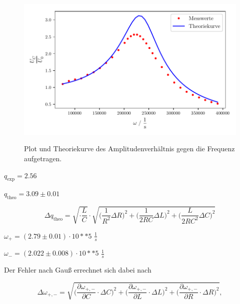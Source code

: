 \begin{figure}
    \centering
    \includegraphics{build/plot-guete.pdf}
    \label{fig:guete}
    \caption{Plot und Theoriekurve des Amplitudenverhältnis gegen die Frequenz aufgetragen.}
\end{figure}

\begin{center}
    $q_\text{exp} = 2.56$
\end{center}

\begin{center}
    $q_\text{theo} = 3.09 \pm 0.01$
\end{center}

\begin{equation}
    \Delta q_\text{theo} = \sqrt{\cdot \frac{L}{C}} \cdot \sqrt{ \bigg( \frac{1}{R^2} \Delta R \bigg)^2 + \bigg(\frac{1}{2RC} \Delta L \bigg)^2 + \bigg(\frac{L}{2RC^2} \Delta C \bigg)^2}
\end{equation}

\begin{center}
    $\omega_+ = (2.79 \pm 0.01) \cdot 10**{5}$ $\frac{1}{s}$

    $\omega_- = (2.022 \pm 0.008) \cdot 10**{5}$ $\frac{1}{s}$
\end{center}

Der Fehler nach Gauß errechnet sich dabei nach

\begin{equation}
    \Delta \omega_{+,-} = \sqrt{\bigg( \frac{\partial \omega_{+,-}}{\partial C} \cdot \Delta C \bigg)^2 + \bigg( \frac{\partial \omega_{+,-}}{\partial L} \cdot \Delta L \bigg)^2 + \bigg( \frac{\partial \omega_{+,-}}{\partial R} \cdot \Delta R \bigg)^2}, 
\end{equation}

